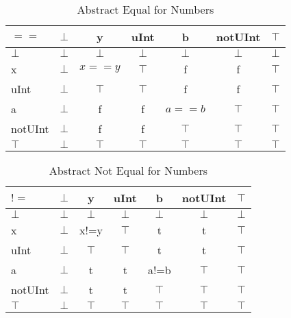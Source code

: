 \begin{table}[htbp]
\centering
\begin{tabular}{l|cccccc}
$==$    & $\bot$ & y      & uInt   & b      & notUInt & $\top$ \\\hline
$\bot$  & $\bot$ & $\bot$ & $\bot$ & $\bot$ & $\bot$  & $\bot$ \\
x       & $\bot$ & $x==y$ & $\top$ & f      & f       & $\top$ \\
uInt    & $\bot$ & $\top$ & $\top$ & f      & f       & $\top$ \\
a       & $\bot$ & f      & f      & $a==b$ & $\top$  & $\top$ \\
notUInt & $\bot$ & f      & f      & $\top$ & $\top$  & $\top$ \\
$\top$  & $\bot$ & $\top$ & $\top$ & $\top$ & $\top$  & $\top$
\end{tabular}
\caption{Abstract Equal for Numbers}
\label{tab:abstract_equal_number}
\end{table}

\begin{table}[htbp]
\centering
\begin{tabular}{l|cccccc}
$!=$    & $\bot$ & y      & uInt   & b      & notUInt & $\top$ \\\hline
$\bot$  & $\bot$ & $\bot$ & $\bot$ & $\bot$ & $\bot$  & $\bot$ \\
x       & $\bot$ & x!=y   & $\top$ & t      & t       & $\top$ \\
uInt    & $\bot$ & $\top$ & $\top$ & t      & t       & $\top$ \\
a       & $\bot$ & t      & t      & a!=b   & $\top$  & $\top$ \\
notUInt & $\bot$ & t      & t      & $\top$ & $\top$  & $\top$ \\
$\top$  & $\bot$ & $\top$ & $\top$ & $\top$ & $\top$  & $\top$
\end{tabular}
\caption{Abstract Not Equal for Numbers}
\label{tab:abstract_not_equal_number}
\end{table}

